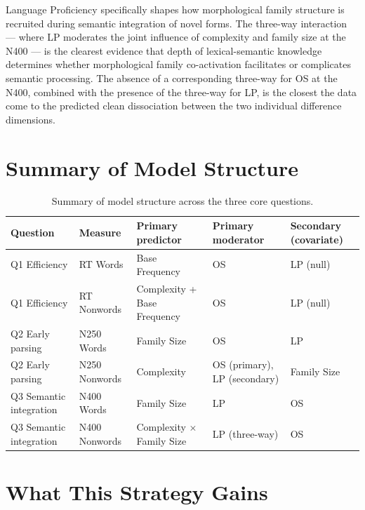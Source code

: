 \documentclass[12pt]{article}
\begin{document}
	Language Proficiency specifically shapes how morphological family structure is recruited during semantic integration of novel forms. The three-way interaction --- where LP moderates the joint influence of complexity and family size at the N400 --- is the clearest evidence that depth of lexical-semantic knowledge determines whether morphological family co-activation facilitates or complicates semantic processing. The absence of a corresponding three-way for OS at the N400, combined with the presence of the three-way for LP, is the closest the data come to the predicted clean dissociation between the two individual difference dimensions.
	
	\section{Summary of Model Structure}
	
	\begin{table}[h!]
		\centering
		\renewcommand{\arraystretch}{1.4}
		\begin{tabular}{p{2cm} p{2.2cm} p{3cm} p{2.8cm} p{3cm}}
			\toprule
			\textbf{Question} & \textbf{Measure} & \textbf{Primary predictor} & \textbf{Primary moderator} & \textbf{Secondary (covariate)} \\
			\midrule
			Q1 Efficiency & RT Words       & Base Frequency              & OS                          & LP (null) \\
			Q1 Efficiency & RT Nonwords    & Complexity + Base Frequency & OS                          & LP (null) \\
			Q2 Early parsing & N250 Words  & Family Size                 & OS                          & LP \\
			Q2 Early parsing & N250 Nonwords & Complexity                & OS (primary), LP (secondary) & Family Size \\
			Q3 Semantic integration & N400 Words & Family Size            & LP                          & OS \\
			Q3 Semantic integration & N400 Nonwords & Complexity $\times$ Family Size & LP (three-way)   & OS \\
			\bottomrule
		\end{tabular}
		\caption{Summary of model structure across the three core questions.}
	\end{table}
	
	\section{What This Strategy Gains}
	
\end{document}
